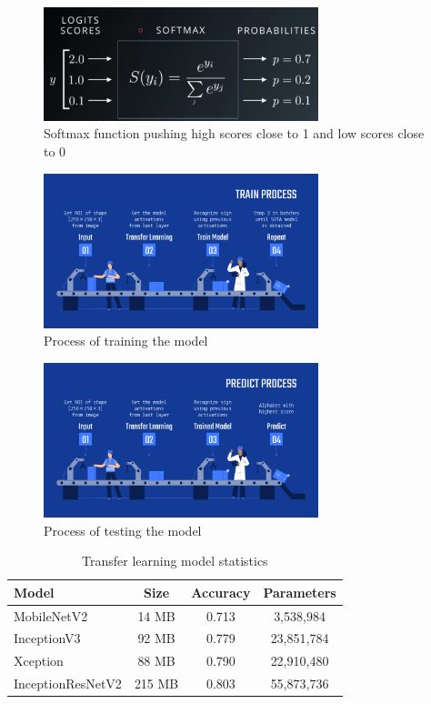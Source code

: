 \documentclass[twocolumn]{article}
\begin{document}
\begin{figure}[h]
\centering
\includegraphics[width=8cm]{./figures/softmax function}
\caption{Softmax function pushing high scores close to 1 and low scores close to 0}
\end{figure}

\begin{figure}[h]
\centering
\includegraphics[width=8cm]{./figures/train process}
\caption{Process of training the model}
\end{figure}

\begin{figure}[h]
\centering
\includegraphics[width=8cm]{./figures/predict process}
\caption{Process of testing the model}
\end{figure}

\clearpage

\begin{table}[h]
\begin{tabular}{ |l|c|c|c| }
  \hline
  \textbf{Model} & \textbf{Size} & \textbf{Accuracy} & \textbf{Parameters} \\ \hline
  MobileNetV2 & 14 MB & 0.713 & 3,538,984 \\ \hline
  InceptionV3 & 92 MB & 0.779 & 23,851,784 \\ \hline
  Xception & 88 MB & 0.790 & 22,910,480 \\ \hline
  InceptionResNetV2 & 215 MB & 0.803 & 55,873,736 \\
  \hline
\end{tabular}
\caption{Transfer learning model statistics}
\end{table}
\end{document}
